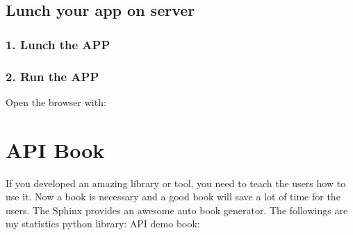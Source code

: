 \documentclass[letterpaper,12pt,english]{sphinxmanual}
\begin{document}
\begin{sphinxVerbatim}[commandchars=\\\{\}]
   
           
         
\end{sphinxVerbatim}


\section{Lunch your app on server}
\label{\detokenize{deploy:lunch-your-app-on-server}}

\subsection{1. Lunch the APP}
\label{\detokenize{deploy:lunch-the-app}}
\begin{sphinxVerbatim}[commandchars=\\\{\}]
 
\end{sphinxVerbatim}


\subsection{2. Run the APP}
\label{\detokenize{deploy:run-the-app}}
\sphinxAtStartPar
Open the browser with: 

\begin{figure}[htbp]
\centering

\noindent{}
\end{figure}


\chapter{API Book}
\label{\detokenize{api:api-book}}\label{\detokenize{api:api}}\label{\detokenize{api::doc}}
\sphinxAtStartPar
If you developed an amazing library or tool, you need to teach the users how to use it. Now a  book is necessary and a good  book will save a lot of time for the users. The Sphinx provides an awesome auto  book generator. The followings are my statistics python library:  API demo book:
\end{document}
